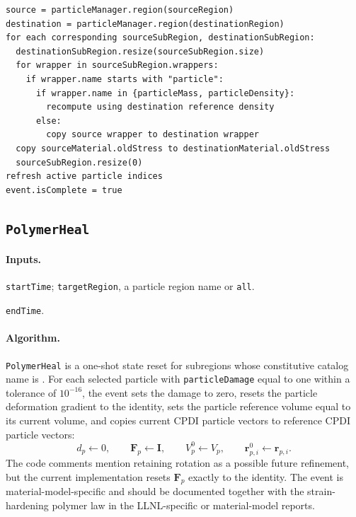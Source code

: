 \begin{lstlisting}[caption={MaterialSwap event pseudocode.}]
source = particleManager.region(sourceRegion)
destination = particleManager.region(destinationRegion)
for each corresponding sourceSubRegion, destinationSubRegion:
  destinationSubRegion.resize(sourceSubRegion.size)
  for wrapper in sourceSubRegion.wrappers:
    if wrapper.name starts with "particle":
      if wrapper.name in {particleMass, particleDensity}:
        recompute using destination reference density
      else:
        copy source wrapper to destination wrapper
  copy sourceMaterial.oldStress to destinationMaterial.oldStress
  sourceSubRegion.resize(0)
refresh active particle indices
event.isComplete = true
\end{lstlisting}

\subsection{\texttt{PolymerHeal}}
\label{subsec:event-polymer-heal}

\paragraph{Inputs.}
\begin{description}[leftmargin=*,style=nextline]
\item[\textbf{Required.}] \texttt{startTime}; \texttt{targetRegion}, a particle region name or \texttt{all}.
\item[\textbf{Optional.}] \texttt{endTime}.
\end{description}

\paragraph{Algorithm.}
\texttt{PolymerHeal} is a one-shot state reset for subregions whose constitutive catalog name is .  For each selected particle with \texttt{particleDamage} equal to one within a tolerance of $10^{-16}$, the event sets the damage to zero, resets the particle deformation gradient to the identity, sets the particle reference volume equal to its current volume, and copies current CPDI particle vectors to reference CPDI particle vectors:
\begin{equation}
  d_p\leftarrow 0,
  \qquad
  \mathbf{F}_p\leftarrow\mathbf{I},
  \qquad
  V^0_p\leftarrow V_p,
  \qquad
  \mathbf{r}^0_{p,i}\leftarrow\mathbf{r}_{p,i}.
  \label{eq:polymer-heal-reset}
\end{equation}
The code comments mention retaining rotation as a possible future refinement, but the current implementation resets $\mathbf{F}_p$ exactly to the identity.  The event is material-model-specific and should be documented together with the strain-hardening polymer law in the LLNL-specific or material-model reports.


